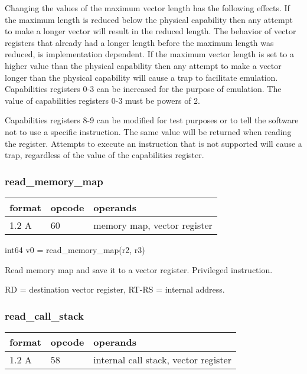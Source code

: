 \documentclass[forwardcom.tex]{subfiles}
\begin{document}
Changing the values of the maximum vector length has the following effects. If the maximum length is reduced below the physical capability then any attempt to make a longer vector will result in the reduced length. The behavior of vector registers that already had a longer length before the maximum length was reduced, is implementation dependent. If the maximum vector length is set to a higher value than the physical capability then any attempt to make a vector longer than the physical capability will cause a trap to facilitate emulation. Capabilities registers 0-3 can be increased for the purpose of emulation. The value of capabilities registers 0-3 must be powers of 2.
\vspace{2mm}

Capabilities registers 8-9 can be modified for test purposes or to tell the software not to use a specific instruction. The same value will be returned when reading the register. Attempts to execute an instruction that is not supported will cause a trap, regardless of the value of the capabilities register.

\subsubsection{read\_memory\_map}
\label{table:readMemoryMapInstruction}
\begin{tabular}{|p{12mm}|p{12mm}|p{110mm}|}
\hline
\bfseries format & \bfseries opcode & \bfseries operands \\ \hline
1.2 A & 60 & memory map, vector register \\ \hline
\end{tabular}
\vspace{2mm}

int64 v0 = read\_memory\_map(r2, r3)
\vspace{2mm}

Read memory map and save it to a vector register. Privileged instruction.
\vspace{2mm}

RD = destination vector register, RT-RS = internal address.

\subsubsection{read\_call\_stack}
\label{table:readCallStackInstruction}
\begin{tabular}{|p{12mm}|p{12mm}|p{110mm}|}
\hline
\bfseries format & \bfseries opcode & \bfseries operands \\ \hline
1.2 A & 58 & internal call stack, vector register \\ \hline
\end{tabular}
\vspace{2mm}
\end{document}
